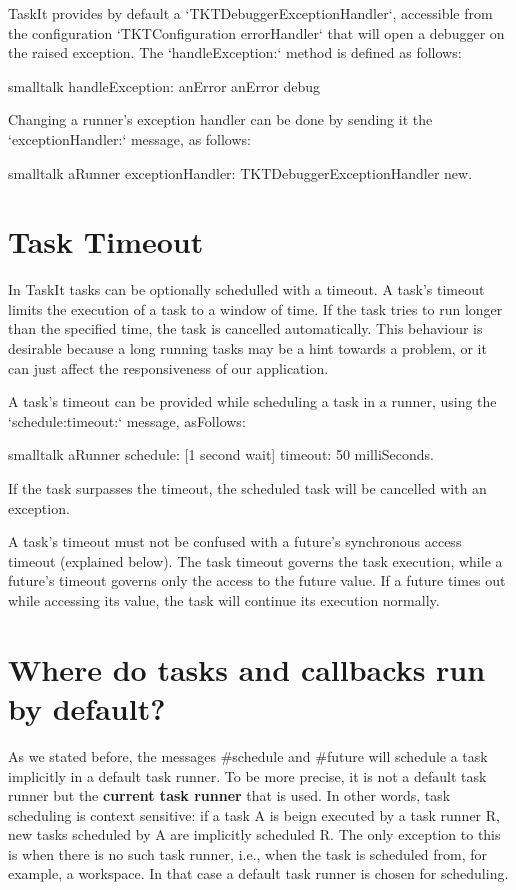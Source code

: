 \documentclass[10pt,twoside,english]{_support/latex/sbabook/sbabook}
\begin{document}
TaskIt provides by default a `TKTDebuggerExceptionHandler`, accessible from the configuration `TKTConfiguration errorHandler` that will open a debugger on the raised exception. The `handleException:` method is defined as follows:

\begin{displaycode}{smalltalk}
handleException: anError 
	anError debug
\end{displaycode}

Changing a runner's exception handler can be done by sending it the `exceptionHandler:` message, as follows:

\begin{displaycode}{smalltalk}
aRunner exceptionHandler: TKTDebuggerExceptionHandler new.
\end{displaycode}
\section{Task Timeout}
In TaskIt tasks can be optionally schedulled with a timeout. A task's timeout limits the execution of a task to a window of time. If the task tries to run longer than the specified time, the task is cancelled automatically. This behaviour is desirable because a long running tasks may be a hint towards a problem, or it can just affect the responsiveness of our application.

A task's timeout can be provided while scheduling a task in a runner, using the `schedule:timeout:` message, asFollows: 

\begin{displaycode}{smalltalk}
aRunner schedule: [1 second wait] timeout: 50 milliSeconds.
\end{displaycode}

If the task surpasses the timeout, the scheduled task will be cancelled with an exception.

A task's timeout must not be confused with a future's synchronous access timeout (explained below). The task timeout governs the task execution, while a future's timeout governs only the access to the future value. If a future times out while accessing its value, the task will continue its execution normally.
\section{Where do tasks and callbacks run by default?}
As we stated before, the messages \#schedule and \#future will schedule a task implicitly in a default task runner. To be more precise, it is not a default task runner but the \textbf{current task runner} that is used. In other words, task scheduling is context sensitive: if a task A is beign executed by a task runner R, new tasks scheduled by A are implicitly scheduled R. The only exception to this is when there is no such task runner, i.e., when the task is scheduled from, for example, a workspace. In that case a default task runner is chosen for scheduling.
\end{document}
